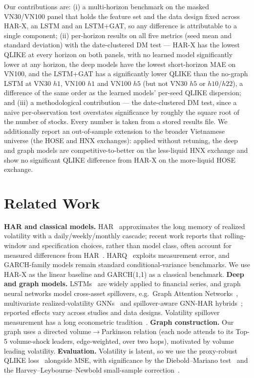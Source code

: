 \documentclass[runningheads]{llncs}
\begin{document}
Our contributions are: (i) a multi-horizon benchmark on the masked VN30/VN100 panel that holds
the feature set and the data design fixed across HAR-X, an LSTM and an LSTM+GAT, so any difference is
attributable to a single component; (ii) per-horizon results on all five metrics (seed mean and standard
deviation) with the date-clustered DM test --- HAR-X has the lowest QLIKE at every horizon on both panels, with
no learned model significantly lower at any horizon, the deep models have the lowest short-horizon MAE on
VN100, and the LSTM+GAT has a significantly lower QLIKE than the no-graph LSTM at VN30 $h1$, VN100 $h1$ and
VN100 $h5$ (but not VN30 $h5$ or $h10$/$h22$), a difference of the same order as the learned models' per-seed
QLIKE dispersion; and (iii) a methodological contribution --- the
date-clustered DM test, since a naive per-observation test overstates significance by roughly the square root of the number of stocks. Every number is taken from a stored results file.
We additionally report an out-of-sample extension to the broader Vietnamese universe (the HOSE and HNX
exchanges): applied without retuning, the deep and graph models are competitive-to-better on the less-liquid
HNX exchange and show no significant QLIKE difference from HAR-X on the more-liquid HOSE exchange.

\section{Related Work}
\textbf{HAR and classical models.} HAR~\cite{corsi2009} approximates the long memory of realized volatility
with a daily/weekly/monthly cascade; recent work reports that rolling-window and specification choices, rather
than model class, often account for measured differences from HAR~\cite{audrino2025}. HARQ~\cite{harq2016}
exploits measurement error, and GARCH-family models remain standard conditional-variance benchmarks. We use
HAR-X as the linear baseline and GARCH(1,1) as a classical benchmark. \textbf{Deep and graph models.} LSTMs~\cite{lstm1997} are widely applied to
financial series, and graph neural networks model cross-asset spillovers, e.g.\ Graph Attention
Networks~\cite{gat2018}, multivariate realized-volatility GNNs~\cite{chen2022} and spillover-aware GNN-HAR
hybrids~\cite{gnnhar2025}; reported effects vary across studies and data designs. Volatility spillover
measurement has a long econometric tradition~\cite{dy2012}. \textbf{Graph construction.} Our graph uses a
directed volume$\to$Parkinson relation (each node attends to its Top-5 volume-shock leaders, edge-weighted,
over two hops), motivated by volume leading volatility. \textbf{Evaluation.} Volatility is latent, so we use
the proxy-robust QLIKE loss~\cite{patton2011} alongside MSE, with significance by the Diebold--Mariano
test~\cite{dm1995} and the Harvey--Leybourne--Newbold small-sample correction~\cite{hln1997}.
\end{document}
